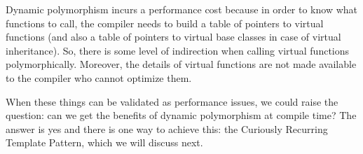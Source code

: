Dynamic polymorphism incurs a performance cost because in order to know what functions to call, the compiler needs to build a table of pointers to virtual functions (and also a table of pointers to virtual base classes in case of virtual inheritance). So, there is some level of indirection when calling virtual functions polymorphically. Moreover, the details of virtual functions are not made available to the compiler who cannot optimize them.

When these things can be validated as performance issues, we could raise the question: can we get the benefits of dynamic polymorphism at compile time? The answer is yes and there is one way to achieve this: the Curiously Recurring Template Pattern, which we will discuss next.










































